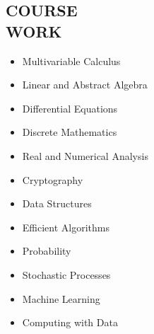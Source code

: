\documentclass[margin, 8pt]{res} %
\begin{document}
\begin{resume}
\section{COURSE \\ WORK}             
               \begin{multicols}{2}
	       \begin{itemize}\itemsep -2pt
		\item Multivariable Calculus\\
 		\item Linear and Abstract Algebra\\
		\item Differential Equations\\
		\item Discrete Mathematics\\
		\item Real and Numerical Analysis\\
		\item Cryptography\\
		\item Data Structures\\
                \item Efficient Algorithms\\
		\item Probability
		\item Stochastic Processes\\
		\item Machine Learning\\
                \item Computing with Data\\
		\end{itemize}
	       \end{multicols}




\end{resume}
\end{document}

